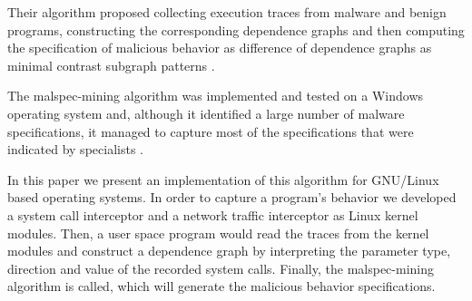 Their algorithm proposed collecting execution traces from malware and benign programs, constructing the corresponding dependence graphs and then computing the specification of malicious behavior as difference of dependence graphs as minimal contrast subgraph patterns \cite{minimal-contrast-subgraph}.

The malspec-mining algorithm was implemented and tested on a Windows operating system and, although it identified a large number of malware specifications, it managed to capture most of the specifications that were indicated by specialists \cite{mining-specifications}.

In this paper we present an implementation of this algorithm for GNU/Linux based operating systems. In order to capture a program’s behavior we developed a system call interceptor and a network traffic interceptor as Linux kernel modules. Then, a user space program would read the traces from the kernel modules and construct a dependence graph by interpreting the parameter type, direction and value of the recorded system calls. Finally, the malspec-mining algorithm is called, which will generate the malicious behavior specifications.
